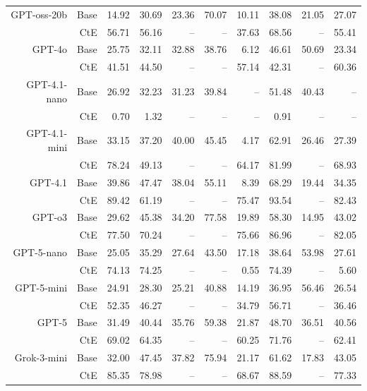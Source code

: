 \begin{table}[!t]
\begin{tabular}{r r !{\color{white!80!black} \vline} r r r r r !{\color{white!80!black} \vline} r r r}
\midrule
\sf GPT-oss-20b & Base & 14.92 & 30.69 & 23.36 & 70.07 & 10.11 & 38.08 & 21.05 & 27.07 \\
 & CtE & 56.71 & 56.16 & -- & -- & 37.63 & 68.56 & -- & 55.41 \\
\midrule
\sf GPT-4o & Base & 25.75 & 32.11 & 32.88 & 38.76 & 6.12 & 46.61 & 50.69 & 23.34 \\
 & CtE & 41.51 & 44.50 & -- & -- & 57.14 & 42.31 & -- & 60.36 \\
\midrule
\sf GPT-4.1-nano & Base & 26.92 & 32.23 & 31.23 & 39.84 & -- & 51.48 & 40.43 & -- \\
 & CtE & 0.70 & 1.32 & -- & -- & -- & 0.91 & -- & -- \\
\midrule
\sf GPT-4.1-mini & Base & 33.15 & 37.20 & 40.00 & 45.45 & 4.17 & 62.91 & 26.46 & 27.39 \\
 & CtE & 78.24 & 49.13 & -- & -- & 64.17 & 81.99 & -- & 68.93 \\
\midrule
\sf GPT-4.1 & Base & 39.86 & 47.47 & 38.04 & 55.11 & 8.39 & 68.29 & 19.44 & 34.35 \\
 & CtE & 89.42 & 61.19 & -- & -- & 75.47 & 93.54 & -- & 82.43 \\
\midrule
\sf GPT-o3 & Base & 29.62 & 45.38 & 34.20 & 77.58 & 19.89 & 58.30 & 14.95 & 43.02 \\
 & CtE & 77.50 & 70.24 & -- & -- & 75.66 & 86.96 & -- & 82.05 \\
\midrule
\sf GPT-5-nano & Base & 25.05 & 35.29 & 27.64 & 43.50 & 17.18 & 38.64 & 53.98 & 27.61 \\
 & CtE & 74.13 & 74.25 & -- & -- & 0.55 & 74.39 & -- & 5.60 \\
\midrule
\sf GPT-5-mini & Base & 24.91 & 28.30 & 25.21 & 40.88 & 14.19 & 36.95 & 56.46 & 26.54 \\
 & CtE & 52.35 & 46.27 & -- & -- & 34.79 & 56.71 & -- & 36.46 \\
\midrule
\sf GPT-5 & Base & 31.49 & 40.44 & 35.76 & 59.38 & 21.87 & 48.70 & 36.51 & 40.56 \\
 & CtE & 69.02 & 64.35 & -- & -- & 60.25 & 71.76 & -- & 62.41 \\
\midrule
\sf Grok-3-mini & Base & 32.00 & 47.45 & 37.82 & 75.94 & 21.17 & 61.62 & 17.83 & 43.05 \\
 & CtE & 85.35 & 78.98 & -- & -- & 68.67 & 88.59 & -- & 77.33 \\
\bottomrule
\end{tabular}
\label{tab:cRi+}
\end{table}
